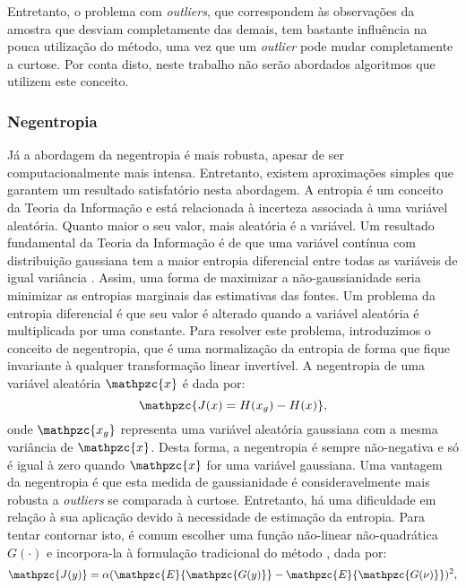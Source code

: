     \bigskip

    Entretanto, o problema com \textit{outliers}, que correspondem às observações da amostra que desviam completamente das demais, tem bastante influência na pouca utilização do método, uma vez que um \textit{outlier} pode mudar completamente a curtose. Por conta disto, neste trabalho não serão abordados algoritmos que utilizem este conceito.
    
\subsubsection{Negentropia} \label{sec:negentropy}

    Já a abordagem da negentropia é mais robusta, apesar de ser computacionalmente mais intensa. Entretanto, existem aproximações simples que garantem um resultado satisfatório nesta abordagem. A entropia é um conceito da Teoria da Informação e está relacionada à incerteza associada à uma variável aleatória. Quanto maior o seu valor, mais aleatória é a variável. Um resultado fundamental da Teoria da Informação é de que uma variável contínua com distribuição gaussiana tem a maior entropia diferencial entre todas as variáveis de igual variância \cite{entropy}. Assim, uma forma de maximizar a não-gaussianidade seria minimizar as entropias marginais das estimativas das fontes. Um problema da entropia diferencial é que seu valor é alterado quando a variável aleatória é multiplicada por uma constante. Para resolver este problema, introduzimos o conceito de negentropia, que é uma normalização da entropia de forma que fique invariante à qualquer transformação linear invertível. A negentropia de uma variável aleatória $\mathpzc{x}$ é dada por:
    \begin{equation}
        \mathpzc{J(x) = H(x_g) - H(x)},
    \end{equation}
    onde $\mathpzc{x_g}$ representa uma variável aleatória gaussiana com a mesma variância de $\mathpzc{x}$. Desta forma, a negentropia é sempre não-negativa e só é igual à zero quando $\mathpzc{x}$ for uma variável gaussiana. Uma vantagem da negentropia é que esta medida de gaussianidade é consideravelmente mais robusta a \textit{outliers} se comparada à curtose.
    Entretanto, há uma dificuldade em relação à sua aplicação devido à necessidade de estimação da entropia. Para tentar contornar isto, é comum escolher uma função não-linear não-quadrática $G(\cdot)$ e incorpora-la à formulação tradicional do método \cite{fastica1}, dada por:
    \begin{equation}
        \mathpzc{J(y)} = \alpha(\mathpzc{E}\{\mathpzc{G(y)}\} - \mathpzc{E}\{\mathpzc{G(\nu)}\})^2,
    \end{equation}
